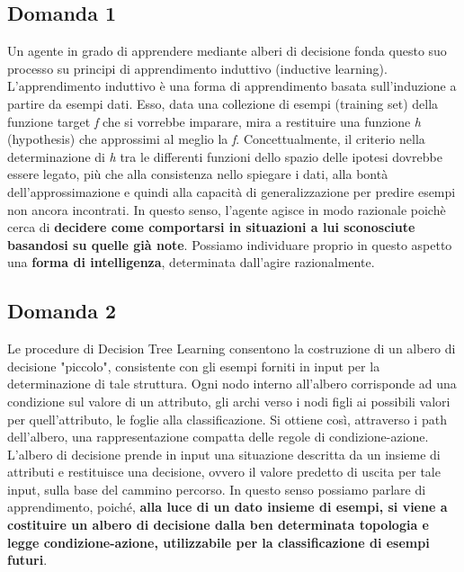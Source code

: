 		\subsection{Domanda 1}
			Un agente in grado di apprendere mediante alberi di decisione fonda questo suo processo su principi di apprendimento induttivo (\textsf{inductive learning}). L'apprendimento induttivo è una forma di apprendimento basata sull'induzione a partire da esempi dati. Esso, data una collezione di esempi (\textsf{training set}) della funzione \textsf{target} \emph{f} che si vorrebbe imparare, mira a restituire una funzione \emph{h} (\textsf{hypothesis}) che approssimi al meglio la \emph{f}. Concettualmente, il criterio nella determinazione di \emph{h} tra le differenti funzioni dello spazio delle ipotesi dovrebbe essere legato, più che alla consistenza nello spiegare i dati, alla bontà dell'approssimazione e quindi alla capacità di generalizzazione per predire esempi non ancora incontrati. In questo senso, l'agente agisce in modo razionale poichè cerca di \textbf{decidere come comportarsi in situazioni a lui sconosciute basandosi su quelle già note}. Possiamo individuare proprio in questo aspetto una \textbf{forma di intelligenza}, determinata dall'agire razionalmente.
		\subsection{Domanda 2}
			Le procedure di \textsf{Decision Tree Learning} consentono la costruzione di un albero di decisione "piccolo", consistente con gli esempi forniti in input per la determinazione di tale struttura. Ogni nodo interno all'albero corrisponde ad una condizione sul valore di un attributo, gli archi verso i nodi figli ai possibili valori per quell'attributo, le foglie alla classificazione. Si ottiene così, attraverso i \textsf{path} dell'albero, una rappresentazione compatta delle regole di condizione-azione. L'albero di decisione prende in input una situazione descritta da un insieme di attributi e restituisce una decisione, ovvero il valore predetto di uscita per tale input, sulla base del cammino percorso. In questo senso possiamo parlare di apprendimento, poiché, \textbf{alla luce di un dato insieme di esempi, si viene a costituire un albero di decisione dalla ben determinata topologia e legge condizione-azione, utilizzabile per la classificazione di esempi futuri}.
